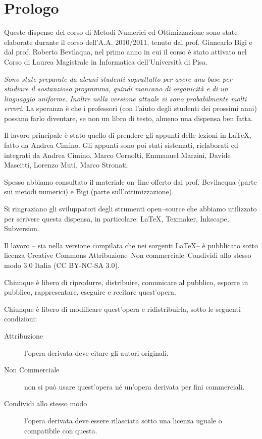 \chapter*{Prologo}
Queste dispense del corso di Metodi Numerici ed Ottimizzazione sono state elaborate durante il corso dell'A.A. 2010/2011, tenuto dal prof. Giancarlo Bigi e dal prof. Roberto Bevilaqua, nel primo anno in cui il corso è stato attivato nel Corso di Laurea Magistrale in Informatica dell'Università di Pisa.

{\em Sono state preparate da alcuni studenti soprattutto per avere una base per studiare il sostanzioso programma,  quindi mancano di organicità e di un linguaggio uniforme. Inoltre nella versione attuale vi sono probabilmente molti errori}. La speranza è che i professori (con l'aiuto degli studenti dei prossimi anni) possano farlo diventare, se non un libro di testo, almeno una dispensa ben fatta.

Il lavoro principale è stato quello di prendere gli appunti delle lezioni in \LaTeX , fatto da Andrea Cimino. Gli appunti sono poi stati sistemati, rielaborati ed integrati da Andrea Cimino, Marco Cornolti, Emmanuel Marzini, Davide Mascitti, Lorenzo Muti, Marco Stronati.

Spesso abbiamo consultato il materiale on--line offerto dai prof. Bevilacqua (parte sui metodi numerici) e Bigi (parte sull'ottimizzazione).

Si ringraziano gli sviluppatori degli strumenti open--source che abbiamo utilizzato per scrivere questa dispensa, in particolare: \LaTeX, Texmaker, Inkscape, Subversion.

Il lavoro -- sia nella versione compilata che nei sorgenti \LaTeX -- è pubblicato sotto licenza Creative Commons Attribuzione--Non commerciale--Condividi allo stesso modo 3.0 Italia (CC BY-NC-SA 3.0).

Chiunque è libero di riprodurre, distribuire, comunicare al pubblico, esporre in pubblico, rappresentare, eseguire e recitare quest'opera.

Chiunque è libero di modificare quest'opera e ridistribuirla, sotto le seguenti condizioni:
\begin{description}
\item[Attribuzione] l'opera derivata deve citare gli autori originali.
\item[Non Commerciale] non si può usare quest'opera né un'opera derivata per fini commerciali.
\item[Condividi allo stesso modo] l'opera derivata deve essere rilasciata sotto una licenza uguale o compatibile con questa.
\end{description}

